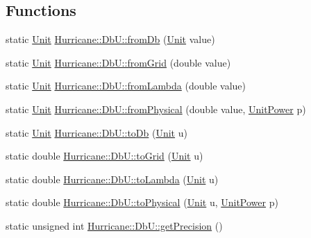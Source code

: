 \subsection*{Functions}
\begin{DoxyCompactItemize}
\item 
static \hyperlink{group__DbUGroup_ga4fbfa3e8c89347af76c9628ea06c4146}{Unit} \hyperlink{group__DbUGroup_gaec69d65ec1651c2feea24c5931f4580b}{Hurricane\+::\+Db\+U\+::from\+Db} (\hyperlink{group__DbUGroup_ga4fbfa3e8c89347af76c9628ea06c4146}{Unit} value)
\item 
static \hyperlink{group__DbUGroup_ga4fbfa3e8c89347af76c9628ea06c4146}{Unit} \hyperlink{group__DbUGroup_ga367e1d1b5ac1df076745550cba8a83c1}{Hurricane\+::\+Db\+U\+::from\+Grid} (double value)
\item 
static \hyperlink{group__DbUGroup_ga4fbfa3e8c89347af76c9628ea06c4146}{Unit} \hyperlink{group__DbUGroup_ga4b570755b19ea9ff0f2f258a221bd935}{Hurricane\+::\+Db\+U\+::from\+Lambda} (double value)
\item 
static \hyperlink{group__DbUGroup_ga4fbfa3e8c89347af76c9628ea06c4146}{Unit} \hyperlink{group__DbUGroup_ga11d4dbd9134a19bda35cbacde1cb2769}{Hurricane\+::\+Db\+U\+::from\+Physical} (double value, \hyperlink{group__DbUGroup_ga50b5785bf4d75026c4c112caec3040a7}{Unit\+Power} p)
\item 
static \hyperlink{group__DbUGroup_ga4fbfa3e8c89347af76c9628ea06c4146}{Unit} \hyperlink{group__DbUGroup_gaec07c6e7ae2a2a6f54e2a16b32c8bf26}{Hurricane\+::\+Db\+U\+::to\+Db} (\hyperlink{group__DbUGroup_ga4fbfa3e8c89347af76c9628ea06c4146}{Unit} u)
\item 
static double \hyperlink{group__DbUGroup_ga318d673386c9424e07c12efd598c730d}{Hurricane\+::\+Db\+U\+::to\+Grid} (\hyperlink{group__DbUGroup_ga4fbfa3e8c89347af76c9628ea06c4146}{Unit} u)
\item 
static double \hyperlink{group__DbUGroup_ga4923a9a443871282ad7d331be2a2a5d4}{Hurricane\+::\+Db\+U\+::to\+Lambda} (\hyperlink{group__DbUGroup_ga4fbfa3e8c89347af76c9628ea06c4146}{Unit} u)
\item 
static double \hyperlink{group__DbUGroup_gab901e9d5c12e878728178f113def6c45}{Hurricane\+::\+Db\+U\+::to\+Physical} (\hyperlink{group__DbUGroup_ga4fbfa3e8c89347af76c9628ea06c4146}{Unit} u, \hyperlink{group__DbUGroup_ga50b5785bf4d75026c4c112caec3040a7}{Unit\+Power} p)
\item 
static unsigned int \hyperlink{group__DbUGroup_ga6169efbdd9b3d54a0bd8467c8f957fda}{Hurricane\+::\+Db\+U\+::get\+Precision} ()
\item 

\end{DoxyCompactItemize}
